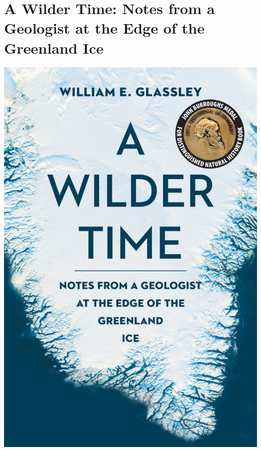 \documentclass{tufte-handout}
\makeatletter
\newcommand{\varcaption}[2][0pt]{%
  \gsetlength{\@tufte@caption@vertical@offset}{-#1}%
  \gdef\@tufte@stored@varcaption{#2}%
}
\gdef\@tufte@stored@varcaption{} %
\makeatother
\begin{document}
\section*{A Wilder Time: Notes from a Geologist at the Edge of the Greenland Ice}
\begin{marginfigure}[5\baselineskip]
   \includegraphics[width=\linewidth]{images/wilder_time.jpg}
   \varcaption{\href{https://blpress.org/books/a-wilder-time/}{Publisher Link}, \href{https://www.amazon.com/Wilder-Time-Notes-Geologist-Greenland/dp/1942658346/}{Amazon Link}}
\end{marginfigure}
\end{document}
